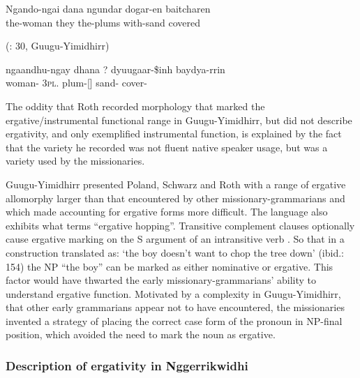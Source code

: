 \ea
Ngando-ngai         dana            ngundar \footnotemark{} dogar-en               baitchare\label{bkm:Ref77508300}n\\
the-woman             they            the-plums           with-sand            covered

(\citealt{roth_structure_1901}: 30, Guugu-Yimidhirr)

\gll ngaandhu-ngay       dhana              ?                      dyuugaar-\$inh        baydya-rrin\\
     woman- 3\textsc{pl}. plum-[] sand- cover-\\
\z

The oddity that Roth recorded morphology that marked the ergative/instrumental functional range in Guugu-Yimidhirr, but did not describe ergativity, and only exemplified instrumental function, is explained by the fact that the variety he recorded was not fluent native speaker usage, but was a variety used by the missionaries.

Guugu-Yimidhirr presented Poland, Schwarz and Roth with a range of ergative allomorphy larger than that encountered by other missionary-grammarians and which made accounting for ergative forms more difficult. The language also exhibits what \citet[154]{haviland_guugu_1979} terms “ergative hopping''. Transitive complement clauses optionally cause ergative marking on the S argument of an intransitive verb \citep[154--156]{haviland_guugu_1979}. So that in a construction translated as: `the boy doesn’t want to chop the tree down' (ibid.: 154) the NP “the boy” can be marked as either nominative or ergative. This factor would have thwarted the early missionary-grammarians' ability to understand ergative function. Motivated by a complexity in Guugu-Yimidhirr, that other early grammarians appear not to have encountered, the missionaries invented a strategy of placing the correct case form of the pronoun in NP-final position, which avoided the need to mark the noun as ergative.

\subsubsection{Description of ergativity in Nggerrikwidhi}
\label{sec:key:10.1.5.3}

